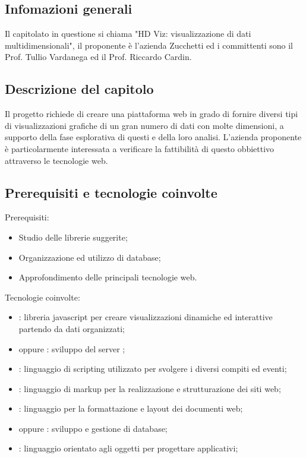 
\subsection{Infomazioni generali}
Il capitolato in questione si chiama "HD Viz: visualizzazione di dati multidimensionali", il proponente è l'azienda Zucchetti ed i committenti sono il Prof. Tullio Vardanega ed il Prof. Riccardo Cardin.

\subsection{Descrizione del capitolo}
Il progetto richiede di creare una piattaforma web in grado di fornire diversi tipi di visualizzazioni grafiche di un gran numero di dati con molte dimensioni, a supporto della fase esplorativa di questi e della loro analisi. 
L’azienda proponente è particolarmente interessata a verificare la fattibilità di questo obbiettivo attraverso le tecnologie web.

\subsection{Prerequisiti e tecnologie coinvolte}
Prerequisiti:
\begin{itemize}
\item Studio delle librerie suggerite;
\item Organizzazione ed utilizzo di database;
\item Approfondimento delle principali tecnologie web.
\end{itemize}

Tecnologie coinvolte:
\begin{itemize}
\item {}: libreria javascript per creare visualizzazioni dinamiche ed interattive partendo da dati organizzati;
\item {} oppure : sviluppo del server ;
\item {}: linguaggio di scripting utilizzato per svolgere i diversi compiti ed eventi;
\item {}: linguaggio di markup per la realizzazione e strutturazione dei siti web;
\item {}: linguaggio per la formattazione e layout dei documenti web;
\item {} oppure : sviluppo e gestione di database;
\item {}: linguaggio orientato agli oggetti per progettare applicativi;
\end{itemize}

